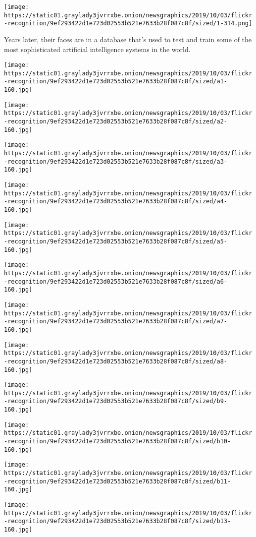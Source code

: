 \texttt{[image: https://static01.graylady3jvrrxbe.onion/newsgraphics/2019/10/03/flickr-recognition/9ef293422d1e723d02553b521e7633b28f087c8f/sized/1-314.png]}

Years later, their faces are in a database that's used to test and train
some of the most sophisticated artificial intelligence systems in the
world.

\texttt{[image: https://static01.graylady3jvrrxbe.onion/newsgraphics/2019/10/03/flickr-recognition/9ef293422d1e723d02553b521e7633b28f087c8f/sized/a1-160.jpg]}

\texttt{[image: https://static01.graylady3jvrrxbe.onion/newsgraphics/2019/10/03/flickr-recognition/9ef293422d1e723d02553b521e7633b28f087c8f/sized/a2-160.jpg]}

\texttt{[image: https://static01.graylady3jvrrxbe.onion/newsgraphics/2019/10/03/flickr-recognition/9ef293422d1e723d02553b521e7633b28f087c8f/sized/a3-160.jpg]}

\texttt{[image: https://static01.graylady3jvrrxbe.onion/newsgraphics/2019/10/03/flickr-recognition/9ef293422d1e723d02553b521e7633b28f087c8f/sized/a4-160.jpg]}

\texttt{[image: https://static01.graylady3jvrrxbe.onion/newsgraphics/2019/10/03/flickr-recognition/9ef293422d1e723d02553b521e7633b28f087c8f/sized/a5-160.jpg]}

\texttt{[image: https://static01.graylady3jvrrxbe.onion/newsgraphics/2019/10/03/flickr-recognition/9ef293422d1e723d02553b521e7633b28f087c8f/sized/a6-160.jpg]}

\texttt{[image: https://static01.graylady3jvrrxbe.onion/newsgraphics/2019/10/03/flickr-recognition/9ef293422d1e723d02553b521e7633b28f087c8f/sized/a7-160.jpg]}

\texttt{[image: https://static01.graylady3jvrrxbe.onion/newsgraphics/2019/10/03/flickr-recognition/9ef293422d1e723d02553b521e7633b28f087c8f/sized/a8-160.jpg]}

\texttt{[image: https://static01.graylady3jvrrxbe.onion/newsgraphics/2019/10/03/flickr-recognition/9ef293422d1e723d02553b521e7633b28f087c8f/sized/b9-160.jpg]}

\texttt{[image: https://static01.graylady3jvrrxbe.onion/newsgraphics/2019/10/03/flickr-recognition/9ef293422d1e723d02553b521e7633b28f087c8f/sized/b10-160.jpg]}

\texttt{[image: https://static01.graylady3jvrrxbe.onion/newsgraphics/2019/10/03/flickr-recognition/9ef293422d1e723d02553b521e7633b28f087c8f/sized/b11-160.jpg]}

\texttt{[image: https://static01.graylady3jvrrxbe.onion/newsgraphics/2019/10/03/flickr-recognition/9ef293422d1e723d02553b521e7633b28f087c8f/sized/b13-160.jpg]}

